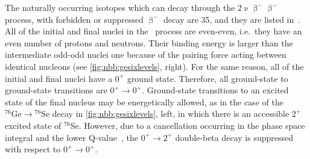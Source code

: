 \blocktitle{$2\upnu\upbeta^-\upbeta^-$}
The naturally occurring isotopes which can decay through the $2\upnu\upbeta^-\upbeta^-$
process, with forbidden or suppressed $\upbeta^-$ decay are 35, and they are listed
in~\cite{Giunti2007}. All of the initial and final nuclei in the \nnbbm\ process are
even-even, i.e.~they have an even number of protons and neutrons. Their binding energy is
larger than the intermediate odd-odd nuclei one because of the pairing force acting
between identical nucleons (see \cref{fig:nbb:gesixlevels}, right). For the same reason,
all of the initial and final nuclei have a $0^+$ ground state.  Therefore, all
ground-state to ground-state transitions are $0^+\rightarrow0^+$. Ground-state transitions
to an excited state of the final nucleus may be energetically allowed, as in the case of
the $^{76}\text{Ge} \rightarrow {^{76}\text{Se}}$ decay in \cref{fig:nbb:gesixlevels},
left, in which there is an accessible $2^+$ excited state of $^{76}$Se. However, due to a
cancellation occurring in the phase space integral and the lower
Q-value~\cite{Tomoda1991}, the $0^+\rightarrow2^+$ double-beta decay is suppressed with
respect to $0^+\rightarrow0^+$.


